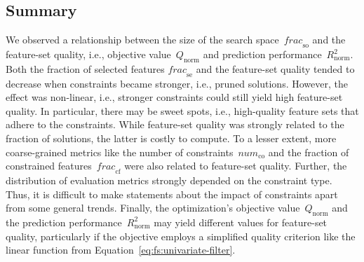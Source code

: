 \subsection{Summary}
\label{sec:syn:evaluation:summary}

We observed a relationship between the size of the search space~$\mathit{frac}_{\text{so}}$ and the feature-set quality, i.e., objective value~$Q_{\text{norm}}$ and prediction performance~$R^{2}_{\text{norm}}$.
Both the fraction of selected features $\mathit{frac}_{\text{se}}$ and the feature-set quality tended to decrease when constraints became stronger, i.e., pruned solutions.
However, the effect was non-linear, i.e., stronger constraints could still yield high feature-set quality.
In particular, there may be sweet spots, i.e., high-quality feature sets that adhere to the constraints.
While feature-set quality was strongly related to the fraction of solutions, the latter is costly to compute.
To a lesser extent, more coarse-grained metrics like the number of constraints~$\mathit{num}_{\text{co}}$ and the fraction of constrained features~$\mathit{frac}_{\text{cf}}$ were also related to feature-set quality.
Further, the distribution of evaluation metrics strongly depended on the constraint type.
Thus, it is difficult to make statements about the impact of constraints apart from some general trends. 
Finally, the optimization's objective value~$Q_{\text{norm}}$ and the prediction performance~$R^{2}_{\text{norm}}$ may yield different values for feature-set quality, particularly if the objective employs a simplified quality criterion like the linear function from Equation~\ref{eq:fs:univariate-filter}.

